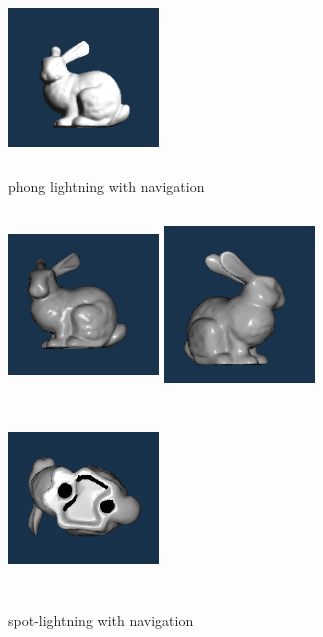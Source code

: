 \documentclass[acmtog]{acmart}
\begin{document}
\begin{figure}[h]
	\includegraphics[width=4cm,height=5cm]{6}
	\caption{phong lightning with navigation}
\end{figure}

\begin{figure}[h]
	\centering
	\includegraphics[width=4cm,height=5cm]{7}
	\includegraphics[width=4cm,height=5cm]{8}
	\includegraphics[width=4cm,height=5cm]{9}
	\caption{spot-lightning with navigation}
\end{figure}
\end{document}
